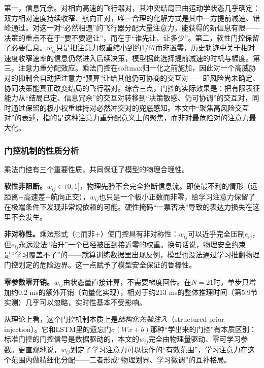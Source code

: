 \documentclass[12pt,a4paper,UTF8]{ctexart}
\begin{document}
第一，信息冗余。对相向高速的飞行器对，其冲突结局已由运动学状态几乎确定：双方相对速度持续收窄、航向正对，唯一合理的化解方式是其中一方提前减速、错峰通过。对这一对“必然相遇”的飞行器分配大量注意力，能获得的新信息有限——决策的重点不在于“要不要避让”，而在于“谁先让、让多少”。第二，软性门控保留了必要信息。$w_{ij}$只是把注意力权重缩小到约1/67而非置零，历史轨迹中关于相对速度收窄速率的信息仍然进入后续决策，模型据此选择提前减速的时机与幅度。第三，注意力重分配效应。乘法门控在softmax归一化之前施加，因此对一个高威胁对的抑制会自动把注意力“预算”让给其他仍可协商的交互对——即风险尚未确定、协同决策能真正改变结局的飞行器对。综合三点，门控的实际效果是：把有限表征能力从“结局已定、信息冗余”的交互对转移到“决策敏感、仍可协调”的交互对，同时通过保留的极小权重维持对必然冲突对的兜底感知。本文中“聚焦高风险交互对”的表述，指的是这种注意力重分配意义上的聚焦，而非对最危险对的注意力最大化。

\subsubsection{门控机制的性质分析}

乘法门控有三个重要性质，共同保证了模型的物理合理性。

\textbf{软性非阻断。}$w_{ij}\in(0,1]$，物理先验不会完全掐断信息流。即使最不利的情形（远距离+高速差+航向正交），$w_{ij}$也只是一个极小正数而非零，给学习注意力保留了在极端条件下发现非常规依赖的可能。硬性掩码“一票否决”导致的表达力损失在这里不会发生。

\textbf{非对称性。}乘法形式（$\odot$而非$+$）使门控具有非对称性：$w_{ij}$可以近乎完全压制$e_{ij}$，但$e_{ij}$永远没法“抬升”一个已经被压到接近零的权重。换句话说，物理安全约束是“学习覆盖不了”的——就算训练数据里出现反例，模型也没法通过学习推翻物理门控划定的危险边界。这一点赋予了模型安全保证的鲁棒性。

\textbf{零参数零开销。}$w_{ij}$由状态量直接计算，不需要梯度回传。在$N=21$时，单步只增加约0.2 ms的额外开销（向量化实现），相对于约213 ms的整体推理时间（第5.9节实测）几乎可以忽略，实时性基本不受影响。

从理论上看，这个门控机制本质上是\emph{结构化先验注入}（structured prior injection）。它和LSTM里的遗忘门$\sigma(Wx+b)$那种“学出来的门控”有本质区别：标准门控的门控信号是数据驱动的，本文的$w_{ij}$完全由物理量驱动、零可学习参数。更直观地说，$w_{ij}$划定了学习注意力可以操作的“有效范围”，学习注意力在这个范围内做精细化分配——二者形成“物理划界、学习微调”的互补格局。
\end{document}
